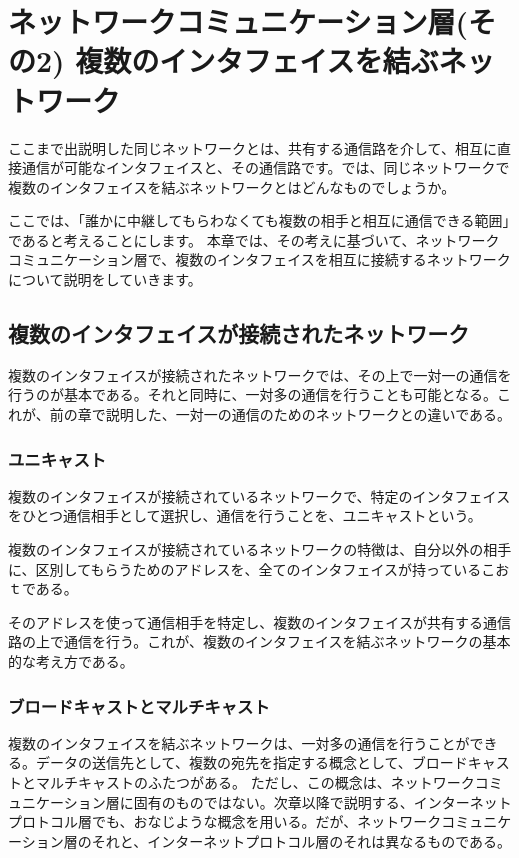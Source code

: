 \chapter{ネットワークコミュニケーション層(その2) 複数のインタフェイスを結ぶネットワーク}



ここまで出説明した同じネットワークとは、共有する通信路を介して、相互に直接通信が可能なインタフェイスと、その通信路です。では、同じネットワークで複数のインタフェイスを結ぶネットワークとはどんなものでしょうか。

ここでは、「誰かに中継してもらわなくても複数の相手と相互に通信できる範囲」であると考えることにします。
本章では、その考えに基づいて、ネットワークコミュニケーション層で、複数のインタフェイスを相互に接続するネットワークについて説明をしていきます。

\section{複数のインタフェイスが接続されたネットワーク}

複数のインタフェイスが接続されたネットワークでは、その上で一対一の通信を行うのが基本である。それと同時に、一対多の通信を行うことも可能となる。これが、前の章で説明した、一対一の通信のためのネットワークとの違いである。

\subsection{ユニキャスト}
複数のインタフェイスが接続されているネットワークで、特定のインタフェイスをひとつ通信相手として選択し、通信を行うことを、ユニキャストという。

複数のインタフェイスが接続されているネットワークの特徴は、自分以外の相手に、区別してもらうためのアドレスを、全てのインタフェイスが持っているこおｔである。

そのアドレスを使って通信相手を特定し、複数のインタフェイスが共有する通信路の上で通信を行う。これが、複数のインタフェイスを結ぶネットワークの基本的な考え方である。


\subsection{ブロードキャストとマルチキャスト}
複数のインタフェイスを結ぶネットワークは、一対多の通信を行うことができる。データの送信先として、複数の宛先を指定する概念として、ブロードキャストとマルチキャストのふたつがある。
ただし、この概念は、ネットワークコミュニケーション層に固有のものではない。次章以降で説明する、インターネットプロトコル層でも、おなじような概念を用いる。だが、ネットワークコミュニケーション層のそれと、インターネットプロトコル層のそれは異なるものである。

